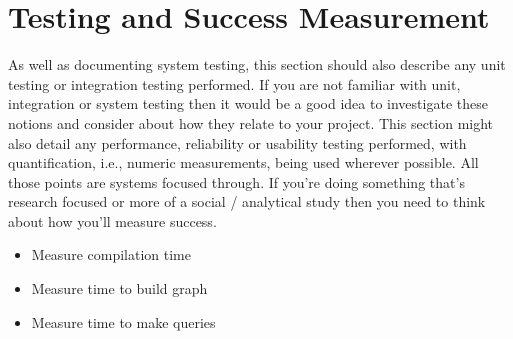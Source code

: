 
\chapter{Testing and Success Measurement}

As well as documenting system testing, this section should also
describe any unit testing or integration testing performed. If you are not familiar with unit, integration or
system testing then it would be a good idea to investigate these notions and consider about how they
relate to your project. This section might also detail any performance, reliability or usability testing
performed, with quantification, i.e., numeric measurements, being used wherever possible. All those points
are systems focused through. If you’re doing something that’s research focused or more of a social /
analytical study then you need to think about how you’ll measure success.

\begin{itemize}
\item Measure compilation time 
\item Measure time to build graph 
\item Measure time to make queries 
\end{itemize}

